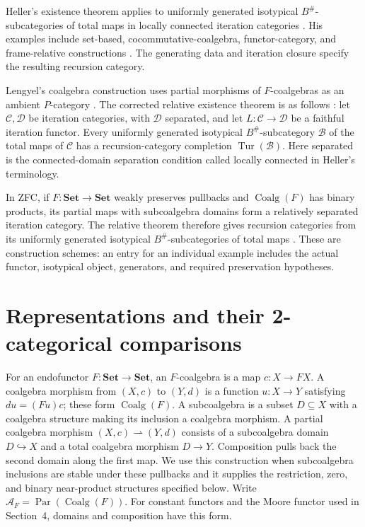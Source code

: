 \documentclass[11pt]{article}
\theoremstyle{definition}
\newcommand{\C}{\mathcal C}
\newcommand{\Set}{\mathbf{Set}}
\newcommand{\Par}{\operatorname{Par}}
\newcommand{\Coalg}{\operatorname{Coalg}}
\begin{document}
Heller's existence theorem applies to uniformly generated isotypical
$B^\#$-subcategories of total maps in locally connected iteration categories
\cite[Theorem 9.2]{Heller}. His examples include set-based,
cocommutative-coalgebra, functor-category, and frame-relative
constructions \cite[\S10]{Heller}. The generating data and iteration
closure specify the resulting recursion category.

Lengyel's coalgebra construction uses partial morphisms of
$F$-coalgebras as an ambient $P$-category \cite{Coalgebras}.
The corrected relative existence theorem is as follows
\cite[Theorem 6.4]{Corrections}: let $\C,\mathcal D$ be iteration
categories, with $\mathcal D$ separated, and let
$L:\C\to\mathcal D$ be a faithful iteration functor. Every uniformly
generated isotypical $B^\#$-subcategory $\mathcal B$ of the total
maps of $\C$ has a recursion-category completion $\operatorname{Tur}(\mathcal B)$.
Here separated is the connected-domain separation condition called
locally connected in Heller's terminology.

In ZFC, if $F:\Set\to\Set$ weakly preserves pullbacks and
$\Coalg(F)$ has binary products, its partial maps with subcoalgebra
domains form a relatively separated iteration category. The relative
theorem therefore gives recursion categories from its uniformly
generated isotypical $B^\#$-subcategories of total maps
\cite[Theorem 10.1]{Corrections}. These are construction schemes:
an entry for an individual example includes the actual functor,
isotypical object, generators, and required preservation hypotheses.

\section{Representations and their 2-categorical comparisons}

For an endofunctor $F:\Set\to\Set$, an $F$-coalgebra is a map
$c:X\to FX$. A coalgebra morphism from $(X,c)$ to $(Y,d)$ is a
function $u:X\to Y$ satisfying $du=(Fu)c$; these form
$\Coalg(F)$. A subcoalgebra is a subset $D\subseteq X$ with a
coalgebra structure making its inclusion a coalgebra morphism.
A partial coalgebra morphism $(X,c)\rightharpoonup(Y,d)$ consists
of a subcoalgebra domain $D\hookrightarrow X$ and a total coalgebra
morphism $D\to Y$. Composition pulls back the second domain along
the first map. We use this construction when subcoalgebra inclusions
are stable under these pullbacks and it supplies the restriction,
zero, and binary near-product structures specified below. Write
$\mathcal A_F=\Par(\Coalg(F))$. For constant functors and the
Moore functor used in Section~4, domains and composition have this form.
\end{document}
